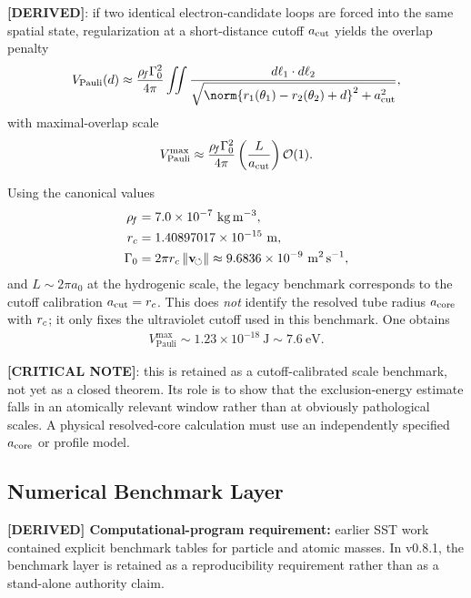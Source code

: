 \textbf{[DERIVED]}: if two identical electron-candidate loops are forced into the same spatial state, regularization at a short-distance cutoff $a_{\rm cut}$ yields the overlap penalty
\begin{align}
    V_{\mathrm{Pauli}}(d)
    \approx
    \frac{\rhoF\Gamma_0^2}{4\pi}
    \iint
    \frac{d\ell_1\cdot d\ell_2}{\sqrt{\norm{r_1(\theta_1)-r_2(\theta_2)+d}^2+a_{\rm cut}^2}},
\end{align}
with maximal-overlap scale
\begin{align}
    V_{\mathrm{Pauli}}^{\max}
    \approx
    \frac{\rho_{\!f}\Gamma_0^2}{4\pi}\left(\frac{L}{a_{\rm cut}}\right)\mathcal{O}(1).
\end{align}

Using the canonical values
\begin{align}
    \rhoF &= 7.0\times 10^{-7}\ \mathrm{kg\,m^{-3}}, \\
    \rc &= 1.40897017\times 10^{-15}\ \mathrm{m}, \\
    \Gamma_0 &= 2\pi \rc\,\vnorm \approx 9.6836\times 10^{-9}\ \mathrm{m^2\,s^{-1}},
\end{align}
and \(L\sim 2\pi a_0\) at the hydrogenic scale, the legacy benchmark corresponds to the cutoff calibration \(a_{\rm cut}=r_c\). This does \emph{not} identify the resolved tube radius \(a_{\rm core}\) with \(r_c\); it only fixes the ultraviolet cutoff used in this benchmark. One obtains
\begin{align}
    V_{\mathrm{Pauli}}^{\max} \sim 1.23\times 10^{-18}\ \mathrm{J} \sim 7.6\ \mathrm{eV}.
\end{align}

\textbf{[CRITICAL NOTE]}: this is retained as a cutoff-calibrated scale benchmark, not yet as a closed theorem. Its role is to show that the exclusion-energy estimate falls in an atomically relevant window rather than at obviously pathological scales. A physical resolved-core calculation must use an independently specified \(a_{\rm core}\) or profile model.

\subsection{Numerical Benchmark Layer}
\textbf{[DERIVED] Computational-program requirement:} earlier SST work contained explicit benchmark tables for particle and atomic masses. In v0.8.1, the benchmark layer is retained as a reproducibility requirement rather than as a stand-alone authority claim.

